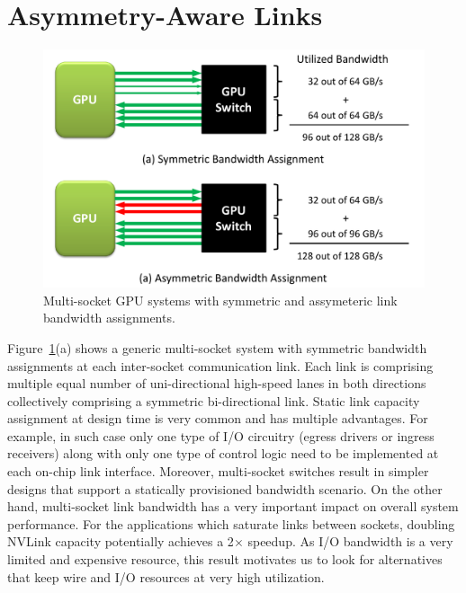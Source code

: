 \section{Asymmetry-Aware Links}
\label{sec:interconnect}

\begin{figure}[t]
    \centering
    \includegraphics[width=1.0\columnwidth]{figures/link_assignment.pdf}
    \caption{Multi-socket GPU systems with symmetric and assymeteric link
    bandwidth assignments.}
    \label{fig:symmetric_assymetric}
    \vspace{-.2in}
\end{figure}

Figure~\ref{fig:symmetric_assymetric}(a) shows a generic multi-socket system
with symmetric bandwidth assignments at each inter-socket communication link.
Each link is comprising multiple equal number of uni-directional high-speed
lanes in both directions collectively comprising a symmetric bi-directional
link.  Static link capacity assignment at design time is very common and has
multiple advantages. For example, in such case only one type of I/O circuitry
(egress drivers or ingress receivers) along with only one type of control logic
need to be implemented at each on-chip link interface. Moreover, multi-socket
switches result in simpler designs that support a statically provisioned
bandwidth scenario. On the other hand, multi-socket link bandwidth has a very
important impact on overall system performance. For the applications which
saturate links between sockets, doubling NVLink capacity potentially achieves a
2$\times$ speedup. As I/O bandwidth is a very limited and expensive resource,
this result motivates us to look for alternatives that keep wire and I/O
resources at very high utilization. 

